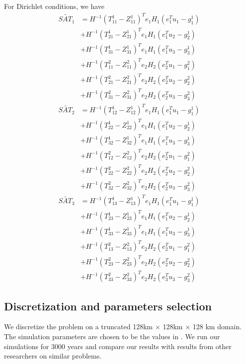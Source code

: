 For Dirichlet conditions, we have
\begin{align}
    \tilde{SAT_1} &= H^{-1} (T_{11}^1 - Z_{11}^1)^T e_1 H_1 (e_1^T u_1 - g_1^1) \nonumber \\
    &+ H^{-1} (T_{21}^1 - Z_{21}^1)^T e_1 H_1 (e_1^T u_2 - g_2^1) \nonumber\\ 
    &+ H^{-1} (T_{31}^1 - Z_{31}^1)^T e_1 H_1 (e_1^T u_3 - g_3^1) \nonumber\\
    &+ H^{-1} (T_{11}^2 - Z_{11}^2)^T e_2 H_2 (e_2^T u_1 - g_1^2) \nonumber\\
    &+ H^{-1} (T_{21}^2 - Z_{21}^2)^T e_2 H_2 (e_2^T u_2 - g_2^2) \nonumber\\
    &+ H^{-1} (T_{31}^2 - Z_{31}^2)^T e_2 H_2 (e_2^T u_3 - g_3^2) \\
    \tilde{SAT_2} &= H^{-1} (T_{12}^1 - Z_{12}^1)^T e_1 H_1 (e_1^T u_1 - g_1^1) \nonumber \\
    & + H^{-1} (T_{22}^1 - Z_{22}^1)^T e_1 H_1 (e_1^T u_2 - g_2^1) \nonumber \\
    & + H^{-1} (T_{32}^1 - Z_{32}^1)^T e_1 H_1 (e_1^T u_3 - g_3^1) \nonumber \\
    & + H^{-1} (T_{12}^2 - Z_{12}^2)^T e_2 H_2 (e_2^T u_1 - g_1^2) \nonumber \\
    & + H^{-1} (T_{22}^2 - Z_{22}^2)^T e_2 H_2 (e_2^T u_2 - g_2^2) \nonumber \\ 
    & + H^{-1} (T_{32}^2 - Z_{32}^2)^T e_2 H_2 (e_2^T u_3 - g_3^2) \\
    \tilde{SAT_3} &= H^{-1} (T_{13}^1 - Z_{13}^1)^T e_1 H_1 (e_1^T u_1 - g_1^1) \nonumber \\
    & + H^{-1} (T_{23}^1 - Z_{23}^1)^T e_1 H_1 (e_1^T u_2 - g_2^1) \nonumber \\ 
    & + H^{-1} (T_{33}^1 - Z_{33}^1)^T e_1 H_1 (e_1^T u_3 - g_3^1) \nonumber \\
    & + H^{-1} (T_{13}^2 - Z_{13}^2)^T e_2 H_2 (e_2^T u_1 - g_1^2) \nonumber \\
    & + H^{-1} (T_{23}^2 - Z_{23}^2)^T e_2 H_2 (e_2^T u_2 - g_2^2) \nonumber \\
    & + H^{-1} (T_{33}^2 - Z_{33}^2)^T e_2 H_2 (e_3^T u_3 - g_3^2)
    \label{eqn:dirichlet-condition}
\end{align}


\subsection{Discretization and parameters selection}
We discretize the problem on a truncated 128km $\times$ 128km $\times$ 128 km domain. The simulation parameters are chosen to be the values in \cite{jiang2020seas}. We run our simulations for 3000 years and compare our results with results from other researchers on similar problems.

